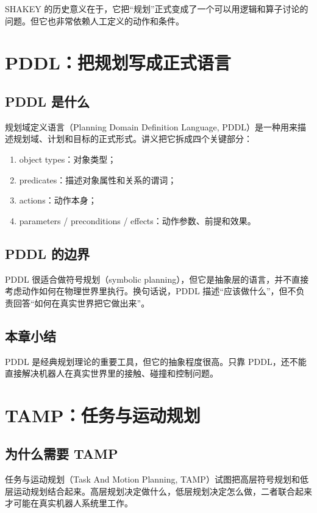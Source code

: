 \documentclass[a4paper]{article}
\begin{document}
SHAKEY 的历史意义在于，它把“规划”正式变成了一个可以用逻辑和算子讨论的问题。但它也非常依赖人工定义的动作和条件。

\section{PDDL：把规划写成正式语言}

\subsection{PDDL 是什么}

规划域定义语言（Planning Domain Definition Language, PDDL）是一种用来描述规划域、计划和目标的正式形式。讲义把它拆成四个关键部分：
\begin{enumerate}
  \item object types：对象类型；
  \item predicates：描述对象属性和关系的谓词；
  \item actions：动作本身；
  \item parameters / preconditions / effects：动作参数、前提和效果。
\end{enumerate}

\subsection{PDDL 的边界}

PDDL 很适合做符号规划（symbolic planning），但它是抽象层的语言，并不直接考虑动作如何在物理世界里执行。换句话说，PDDL 描述“应该做什么”，但不负责回答“如何在真实世界把它做出来”。

\subsection{本章小结}

PDDL 是经典规划理论的重要工具，但它的抽象程度很高。只靠 PDDL，还不能直接解决机器人在真实世界里的接触、碰撞和控制问题。

\section{TAMP：任务与运动规划}

\subsection{为什么需要 TAMP}

任务与运动规划（Task And Motion Planning, TAMP）试图把高层符号规划和低层运动规划结合起来。高层规划决定做什么，低层规划决定怎么做，二者联合起来才可能在真实机器人系统里工作。
\end{document}
